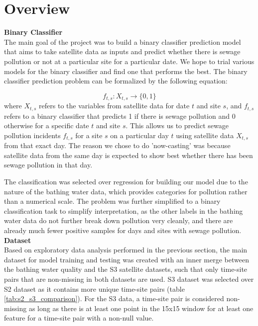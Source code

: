 \documentclass[a4paper,11pt]{report}
\begin{document}
\section{Overview}

\textbf{Binary Classifier} \\
The main goal of the project was to build a binary classifier prediction model that aims to take satellite data as inputs and predict whether there is sewage pollution or not at a particular site for a particular date. We hope to trial various models for the binary classifier and find one that performs the best. The binary classifier prediction problem can be formalized by the following equation: 
 
$$ f_{t,s}: X_{t,s} \rightarrow \{0, 1\} $$ 
where $X_{t,s}$ refers to the variables from satellite data for date $t$ and site $s$, and $f_{t,s}$ refers to a binary classifier that predicts 1 if there is sewage pollution and 0 otherwise for a specific date $t$ and site $s$. This allows us to predict sewage pollution incidents $f_{t,s}$ for a site $s$ on a particular day $t$ using satellite data $X_{t,s}$ from that exact day. The reason we chose to do 'now-casting' was because satellite data from the same day is expected to show best whether there has been sewage pollution in that day.   

The classification was selected over regression for building our model due to the nature of the bathing water data, which provides categories for pollution rather than a numerical scale. The problem was further simplified to a binary classification task to simplify interpretation, as the other labels in the bathing water data do not further break down pollution very cleanly, and there are already much fewer positive samples for days and sites with sewage pollution. \\

\noindent \textbf{Dataset} \\
Based on exploratory data analysis performed in the previous section, the main dataset for model training and testing was created with an inner merge between the bathing water quality and the S3 satellite datasets, such that only time-site pairs that are non-missing in both datasets are used. S3 dataset was selected over S2 dataset as it contains more unique time-site pairs (table \ref{tab:s2_s3_comparison}). For the S3 data, a time-site pair is considered non-missing as long as there is at least one point in the 15x15 window for at least one feature for a time-site pair with a non-null value.
\end{document}
